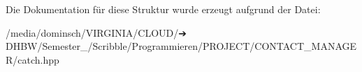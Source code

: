 Die Dokumentation für diese Struktur wurde erzeugt aufgrund der Datei\+:\begin{DoxyCompactItemize}
\item 
/media/dominsch/\+V\+I\+R\+G\+I\+N\+I\+A/\+C\+L\+O\+U\+D/➔ D\+H\+B\+W/\+Semester\+\_/\+Scribble/\+Programmieren/\+P\+R\+O\+J\+E\+C\+T/\+C\+O\+N\+T\+A\+C\+T\+\_\+\+M\+A\+N\+A\+G\+E\+R/catch.\+hpp\end{DoxyCompactItemize}

